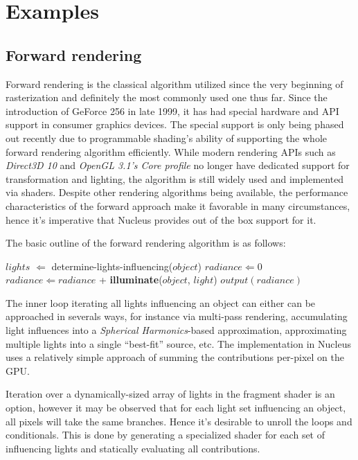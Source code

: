 
\chapter{ Examples }
\label{Chapter6}

\section{Forward rendering}

Forward rendering is the classical algorithm utilized since the very beginning of rasterization and definitely the most commonly used one thus far. Since the introduction of GeForce 256 in late 1999, it has had special hardware and API support in consumer graphics devices. The special support is only being phased out recently due to programmable shading's ability of supporting the whole forward rendering algorithm efficiently. While modern rendering APIs such as \emph{Direct3D 10} and \emph{OpenGL 3.1's Core profile} no longer have dedicated support for transformation and lighting, the algorithm is still widely used and implemented via shaders. Despite other rendering algorithms being available, the performance characteristics of the forward approach make it favorable in many circumstances, hence it's imperative that Nucleus provides out of the box support for it.

The basic outline of the forward rendering algorithm is as follows:
	
\begin{algorithmic}
	\STATE $lights$ $\Leftarrow$ determine-lights-influencing($object$)
	\STATE $radiance \Leftarrow 0$
		\STATE $radiance \Leftarrow radiance$ + \textbf{illuminate}($object$, $light$)
	\ENDFOR
	\STATE $output(radiance)$
\ENDFOR
\end{algorithmic}

The inner loop iterating all lights influencing an object can either can be approached in severals ways, for instance via multi-pass rendering, accumulating light influences into a \emph{Spherical Harmonics}-based approximation, approximating multiple lights into a single ``best-fit'' source, etc. The implementation in Nucleus uses a relatively simple approach of summing the contributions per-pixel on the GPU.

Iteration over a dynamically-sized array of lights in the fragment shader is an option, however it may be observed that for each light set influencing an object, all pixels will take the same branches. Hence it's desirable to unroll the loops and conditionals. This is done by generating a specialized shader for each set of influencing lights and statically evaluating all contributions.

